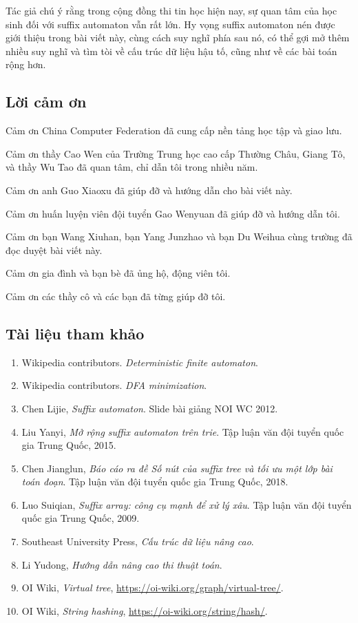 \documentclass[11pt]{article}
\begin{document}
Tác giả chú ý rằng trong cộng đồng thi tin học hiện nay, sự quan tâm của học
sinh đối với suffix automaton vẫn rất lớn. Hy vọng suffix automaton nén được
giới thiệu trong bài viết này, cùng cách suy nghĩ phía sau nó, có thể gợi mở
thêm nhiều suy nghĩ và tìm tòi về cấu trúc dữ liệu hậu tố, cũng như về các bài
toán rộng hơn.

\subsection*{Lời cảm ơn}

Cảm ơn China Computer Federation đã cung cấp nền tảng học tập và giao lưu.

Cảm ơn thầy Cao Wen của Trường Trung học cao cấp Thường Châu, Giang Tô, và
thầy Wu Tao đã quan tâm, chỉ dẫn tôi trong nhiều năm.

Cảm ơn anh Guo Xiaoxu đã giúp đỡ và hướng dẫn cho bài viết này.

Cảm ơn huấn luyện viên đội tuyển Gao Wenyuan đã giúp đỡ và hướng dẫn tôi.

Cảm ơn bạn Wang Xiuhan, bạn Yang Junzhao và bạn Du Weihua cùng trường đã đọc
duyệt bài viết này.

Cảm ơn gia đình và bạn bè đã ủng hộ, động viên tôi.

Cảm ơn các thầy cô và các bạn đã từng giúp đỡ tôi.

\subsection*{Tài liệu tham khảo}

\begin{enumerate}
  \item Wikipedia contributors. \emph{Deterministic finite automaton}.
  \item Wikipedia contributors. \emph{DFA minimization}.
  \item Chen Lijie, \emph{Suffix automaton}. Slide bài giảng NOI WC 2012.
  \item Liu Yanyi, \emph{Mở rộng suffix automaton trên trie}. Tập luận văn đội
  tuyển quốc gia Trung Quốc, 2015.
  \item Chen Jianglun, \emph{Báo cáo ra đề Số nút của suffix tree và tối ưu một
  lớp bài toán đoạn}. Tập luận văn đội tuyển quốc gia Trung Quốc, 2018.
  \item Luo Suiqian, \emph{Suffix array: công cụ mạnh để xử lý xâu}. Tập luận
  văn đội tuyển quốc gia Trung Quốc, 2009.
  \item Southeast University Press, \emph{Cấu trúc dữ liệu nâng cao}.
  \item Li Yudong, \emph{Hướng dẫn nâng cao thi thuật toán}.
  \item OI Wiki, \emph{Virtual tree}, \url{https://oi-wiki.org/graph/virtual-tree/}.
  \item OI Wiki, \emph{String hashing}, \url{https://oi-wiki.org/string/hash/}.
\end{enumerate}
\end{document}
